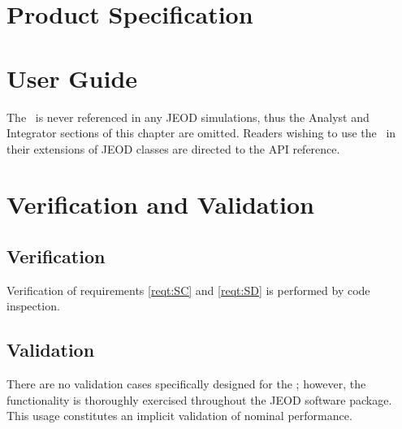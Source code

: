 \chapter{Product Specification}\label{ch:spec}


\chapter{User Guide}\label{ch:user}
The \NamedItemDesc\ is never referenced in any JEOD simulations, thus
the Analyst and Integrator sections of this chapter are omitted.
Readers wishing to use the \NamedItemDesc\ in their extensions of JEOD classes
are directed to the API reference.
\chapter{Verification and Validation}\label{ch:ivv}

\section{Verification}
Verification of requirements \ref{reqt:SC} and \ref{reqt:SD} is performed
by code inspection.
\section{Validation}
There are no validation cases specifically designed for
the \NamedItemDesc; however, the functionality is thoroughly exercised 
throughout the JEOD software package.  This usage constitutes
an implicit validation of nominal performance.
